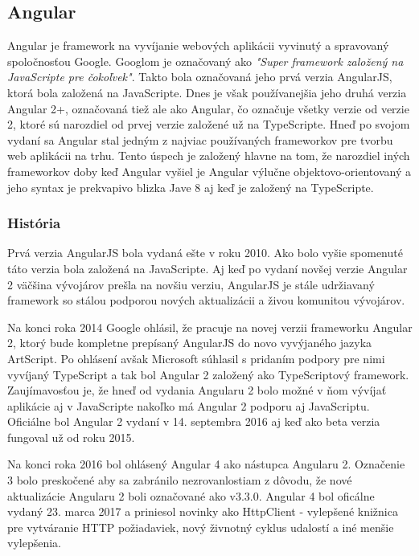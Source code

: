 \subsection{Angular}
\indent Angular je framework na vyvíjanie webových aplikácii vyvinutý a spravovaný spoločnosťou Google. Googlom je označovaný ako \textit{"Super framework založený na JavaScripte pre čokoľvek"}. Takto bola označovaná jeho prvá verzia AngularJS, ktorá bola založená na JavaScripte. Dnes je však používanejšia jeho druhá verzia Angular 2+, označovaná tiež ale ako Angular, čo označuje všetky verzie od verzie 2, ktoré sú narozdiel od prvej verzie založené už na TypeScripte. Hneď po svojom vydaní sa Angular stal jedným z najviac používaných frameworkov pre tvorbu web aplikácii na trhu. Tento úspech je založený hlavne na tom, že narozdiel iných frameworkov doby keď Angular vyšiel je Angular výlučne objektovo-orientovaný a jeho syntax je prekvapivo blizka Jave 8 aj keď je založený na TypeScripte. 

\subsubsection{História}
\indent Prvá verzia AngularJS bola vydaná ešte v roku 2010. Ako bolo vyšie spomenuté táto verzia bola založená na JavaScripte. Aj keď po vydaní novšej verzie Angular 2 väčšina vývojárov prešla na novšiu verziu, AngularJS je stále udržiavaný framework so stálou podporou nových aktualizácii a živou komunitou vývojárov. 

\indent Na konci roka 2014 Google ohlásil, že pracuje na novej verzii frameworku Angular 2, ktorý bude kompletne prepísaný AngularJS do novo vyvýjaného jazyka ArtScript. Po ohlásení avšak Microsoft súhlasil s pridaním podpory pre nimi vyvíjaný TypeScript a tak bol Angular 2 založený ako TypeScriptový framework. Zaujímavosťou je, že hneď od vydania Angularu 2 bolo možné v ňom vývíjať aplikácie aj v JavaScripte nakoľko má Angular 2 podporu aj JavaScriptu. Oficiálne bol Angular 2 vydaní v 14. septembra 2016 aj keď ako beta verzia fungoval už od roku 2015. 

\indent Na konci roka 2016 bol ohlásený Angular 4 ako nástupca Angularu 2. Označenie 3 bolo preskočené aby sa zabránilo nezrovanlostiam z dôvodu, že nové aktualizácie Angularu 2 boli označované ako v3.3.0. Angular 4 bol oficálne vydaný 23. marca 2017 a priniesol novinky ako HttpClient - vylepšené knižnica pre vytváranie HTTP požiadaviek, nový živnotný cyklus udalostí a iné menšie vylepšenia. 

